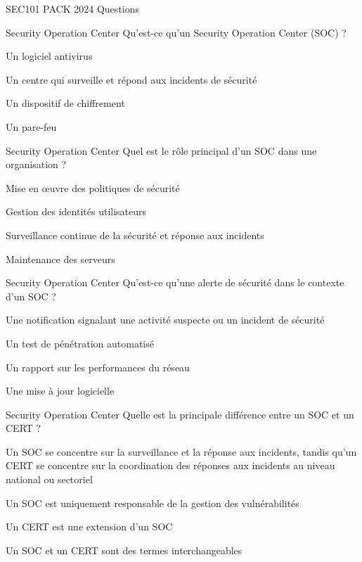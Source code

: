 \documentclass[12pt]{article}
\begin{document}
\begin{quiz}{SEC101 PACK 2024 Questions}
     \begin{multi}[points=1]{Security Operation Center}
     Qu'est-ce qu'un Security Operation Center (SOC) ?
        \item Un logiciel antivirus
        \item *Un centre qui surveille et répond aux incidents de sécurité
        \item Un dispositif de chiffrement
        \item Un pare-feu
      \end{multi} 
    
     \begin{multi}[points=1]{Security Operation Center}
     Quel est le rôle principal d'un SOC dans une organisation ?
        \item Mise en œuvre des politiques de sécurité
        \item Gestion des identités utilisateurs
        \item *Surveillance continue de la sécurité et réponse aux incidents
        \item Maintenance des serveurs
      \end{multi} 
    
     \begin{multi}[points=1]{Security Operation Center}
     Qu'est-ce qu'une alerte de sécurité dans le contexte d'un SOC ?
        \item *Une notification signalant une activité suspecte ou un incident de sécurité
        \item Un test de pénétration automatisé
        \item Un rapport sur les performances du réseau
        \item Une mise à jour logicielle
      \end{multi} 
    
     \begin{multi}[points=1]{Security Operation Center}
     Quelle est la principale différence entre un SOC et un CERT ?
        \item *Un SOC se concentre sur la surveillance et la réponse aux incidents, tandis qu'un CERT se concentre sur la coordination des réponses aux incidents au niveau national ou sectoriel
        \item Un SOC est uniquement responsable de la gestion des vulnérabilités
        \item Un CERT est une extension d'un SOC
        \item Un SOC et un CERT sont des termes interchangeables
      \end{multi} 
    

\end{quiz}
\end{document}
